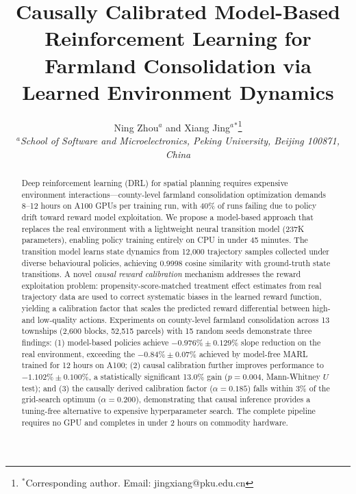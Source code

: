 \documentclass[11pt]{article}
\begin{document}
\title{Causally Calibrated Model-Based Reinforcement Learning for Farmland Consolidation via Learned Environment Dynamics}

\author{Ning Zhou$^{a}$ and Xiang Jing$^{a}$$^{\ast}$\thanks{$^\ast$Corresponding author. Email: jingxiang@pku.edu.cn}\\
$^{a}${\em School of Software and Microelectronics, Peking University, Beijing 100871, China}}

\date{}
\maketitle

\begin{abstract}
Deep reinforcement learning (DRL) for spatial planning requires expensive environment interactions---county-level farmland consolidation optimization demands 8--12 hours on A100 GPUs per training run, with 40\% of runs failing due to policy drift toward reward model exploitation. We propose a model-based approach that replaces the real environment with a lightweight neural transition model (237K parameters), enabling policy training entirely on CPU in under 45 minutes. The transition model learns state dynamics from 12{,}000 trajectory samples collected under diverse behavioural policies, achieving 0.9998 cosine similarity with ground-truth state transitions. A novel \textit{causal reward calibration} mechanism addresses the reward exploitation problem: propensity-score-matched treatment effect estimates from real trajectory data are used to correct systematic biases in the learned reward function, yielding a calibration factor that scales the predicted reward differential between high- and low-quality actions. Experiments on county-level farmland consolidation across 13 townships (2{,}600 blocks, 52{,}515 parcels) with 15 random seeds demonstrate three findings: (1) model-based policies achieve $-0.976\% \pm 0.129\%$ slope reduction on the real environment, exceeding the $-0.84\% \pm 0.07\%$ achieved by model-free MARL trained for 12 hours on A100; (2) causal calibration further improves performance to $-1.102\% \pm 0.100\%$, a statistically significant 13.0\% gain ($p = 0.004$, Mann-Whitney $U$ test); and (3) the causally derived calibration factor ($\alpha = 0.185$) falls within 3\% of the grid-search optimum ($\alpha = 0.200$), demonstrating that causal inference provides a tuning-free alternative to expensive hyperparameter search. The complete pipeline requires no GPU and completes in under 2 hours on commodity hardware.
\end{abstract}
\end{document}
